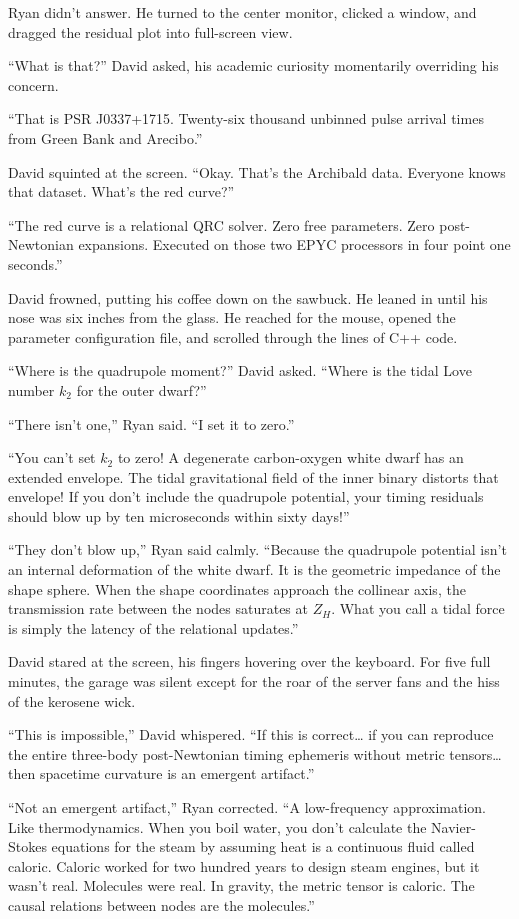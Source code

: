 \documentclass[12pt,twoside,openright]{book}
\begin{document}
Ryan didn't answer. He turned to the center monitor, clicked a window,
and dragged the residual plot into full-screen view.

``What is that?'' David asked, his academic curiosity momentarily
overriding his concern.

``That is PSR J0337+1715. Twenty-six thousand unbinned pulse arrival
times from Green Bank and Arecibo.''

David squinted at the screen. ``Okay. That's the Archibald data.
Everyone knows that dataset. What's the red curve?''

``The red curve is a relational QRC solver. Zero free parameters. Zero
post-Newtonian expansions. Executed on those two EPYC processors in four
point one seconds.''

David frowned, putting his coffee down on the sawbuck. He leaned in
until his nose was six inches from the glass. He reached for the mouse,
opened the parameter configuration file, and scrolled through the lines
of C++ code.

``Where is the quadrupole moment?'' David asked. ``Where is the tidal
Love number \(k_2\) for the outer dwarf?''

``There isn't one,'' Ryan said. ``I set it to zero.''

``You can't set \(k_2\) to zero! A degenerate carbon-oxygen white dwarf
has an extended envelope. The tidal gravitational field of the inner
binary distorts that envelope! If you don't include the quadrupole
potential, your timing residuals should blow up by ten microseconds
within sixty days!''

``They don't blow up,'' Ryan said calmly. ``Because the quadrupole
potential isn't an internal deformation of the white dwarf. It is the
geometric impedance of the shape sphere. When the shape coordinates
approach the collinear axis, the transmission rate between the nodes
saturates at \(Z_H\). What you call a tidal force is simply the latency
of the relational updates.''

David stared at the screen, his fingers hovering over the keyboard. For
five full minutes, the garage was silent except for the roar of the
server fans and the hiss of the kerosene wick.

``This is impossible,'' David whispered. ``If this is correct\ldots{} if
you can reproduce the entire three-body post-Newtonian timing ephemeris
without metric tensors\ldots{} then spacetime curvature is an emergent
artifact.''

``Not an emergent artifact,'' Ryan corrected. ``A low-frequency
approximation. Like thermodynamics. When you boil water, you don't
calculate the Navier-Stokes equations for the steam by assuming heat is
a continuous fluid called caloric. Caloric worked for two hundred years
to design steam engines, but it wasn't real. Molecules were real. In
gravity, the metric tensor is caloric. The causal relations between
nodes are the molecules.''
\end{document}
